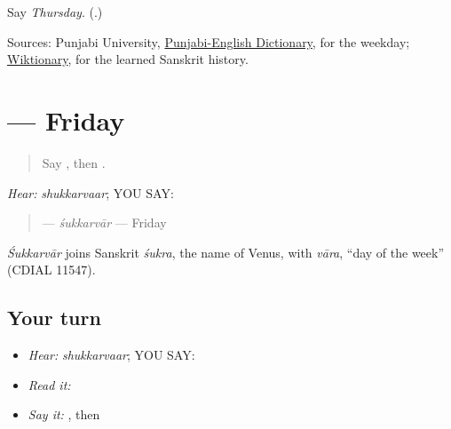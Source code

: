 \begin{tcolorbox}[breakable,colback=teal!4,colframe=teal!35!black,title={Before you move on}]
Say \emph{Thursday}. (\textbf{}.)

Sources: Punjabi University, \href{https://dic.learnpunjabi.org/default.aspx?look=\%E0\%A8\%B5\%E0\%A9\%80\%E0\%A8\%B0\%E0\%A8\%B5\%E0\%A8\%BE\%E0\%A8\%B0}{Punjabi-English Dictionary}, for the weekday; \href{https://en.wiktionary.org/wiki/\%E0\%A8\%B5\%E0\%A9\%80\%E0\%A8\%B0\%E0\%A8\%B5\%E0\%A8\%BE\%E0\%A8\%B0}{Wiktionary}, for the learned Sanskrit history.
\end{tcolorbox}
\section[\texorpdfstring{\pa{ਸ਼ੁੱਕਰਵਾਰ} (shukkarvaar)}{ਸ਼ੁੱਕਰਵਾਰ (shukkarvaar)}]{ — Friday}

\label{lesson:PA-C182-shukkarvar}



\begin{quote}
Say \textbf{}, then \textbf{}.
\end{quote}

\begin{grammarlens}[title={Grammar Lens: one weekday by ear}]
\emph{Hear:} \emph{shukkarvaar}; YOU SAY: \textbf{}

\begin{quote}
\textbf{} — \emph{śukkarvār} — Friday
\end{quote}
\end{grammarlens}

\begin{cousinweb}
\emph{Śukkarvār} joins Sanskrit \emph{śukra}, the name of Venus, with \emph{vāra}, \textquotedblleft{}day of the week\textquotedblright{} (CDIAL 11547).
\end{cousinweb}

\subsection*{Your turn}
\begin{itemize}
\raggedright
  \item \emph{Hear:} \emph{shukkarvaar}; YOU SAY: \textbf{}
  \item \emph{Read it:} \textbf{}
  \item \emph{Say it:} \textbf{}, then \textbf{}
\end{itemize}

